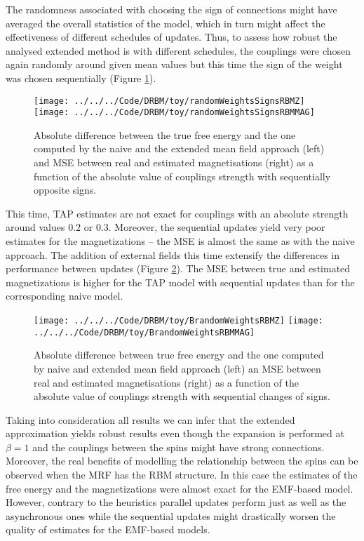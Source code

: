 The randomness associated with choosing the sign of connections might have averaged the overall statistics of the model, which in turn might affect the effectiveness of different schedules of updates. Thus, to assess how robust the analysed extended method is with different schedules, the couplings were chosen again randomly around given mean values but this time the sign of the weight was chosen sequentially (Figure \ref{fig:signs}).
\begin{figure}[!htb]
%
 \texttt{[image: ../../../Code/DRBM/toy/randomWeightsSignsRBMZ]}
\endminipage 
{}  
\texttt{[image: ../../../Code/DRBM/toy/randomWeightsSignsRBMMAG]}
\endminipage\hfill
  \caption[Results on RBM toy model with sequential changes of couplings' signs]{Absolute difference between the true free energy and the one computed by the naive and the extended mean field approach (left) and MSE between real and estimated magnetisations (right) as a function of the absolute value of couplings strength with sequentially opposite signs.}
  \label{fig:signs}
\end{figure}

This time, TAP estimates are not exact for couplings with an absolute strength around values $0.2$ or $0.3$. Moreover, the sequential updates yield very poor estimates for the magnetizations -- the MSE is almost the same as with the naive approach. The addition of external fields this time extensify the differences in performance between updates (Figure \ref{fig:bias}). The MSE between true and estimated magnetizations is higher for the TAP model with sequential updates than for the corresponding naive model.

\begin{figure}[!htb]
%
 \texttt{[image: ../../../Code/DRBM/toy/BrandomWeightsRBMZ]}
\endminipage 
{}  
\texttt{[image: ../../../Code/DRBM/toy/BrandomWeightsRBMMAG]}
\endminipage\hfill
  \caption[Results on RBM toy model with external fields]{Absolute difference between true free energy and the one computed by naive and extended mean field approach (left) an MSE between real and estimated magnetisations (right) as a function of the absolute value of couplings strength with sequential changes of signs.}
  \label{fig:bias}
\end{figure}

Taking into consideration all results we can infer that the extended approximation yields robust results even though the expansion is performed at $\beta = 1$ and the couplings between the spins might have strong connections. Moreover, the real benefits of modelling the relationship between the spins can be observed when the MRF has the RBM structure. In this case the estimates of the free energy and the magnetizations were almost exact for the EMF-based model. However, contrary to the heuristics parallel updates perform just as well as the asynchronous ones while the sequential updates might drastically worsen the quality of estimates for the EMF-based models.

